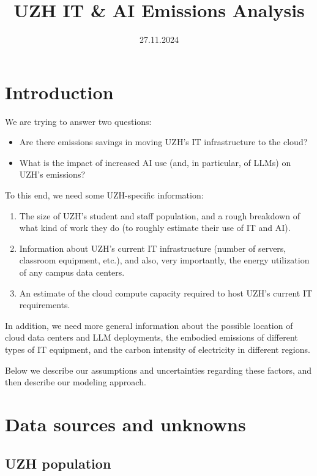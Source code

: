 \documentclass[11pt]{article}
\begin{document}
\title{UZH IT \& AI Emissions Analysis}
\date{27.11.2024}

\section*{Introduction}

We are trying to answer two questions:
\begin{itemize}
    \item Are there emissions savings in moving UZH's IT infrastructure to the cloud?
    \item What is the impact of increased AI use (and, in particular, of LLMs) on UZH's emissions?
\end{itemize}

To this end, we need some UZH-specific information:
\begin{enumerate}
    \item The size of UZH's student and staff population, and a rough breakdown of
        what kind of work they do (to roughly estimate their use of IT and AI).
    \item Information about UZH's current IT infrastructure (number of servers,
        classroom equipment, etc.), and also, very importantly, the energy utilization of any
        campus data centers.
    \item An estimate of the cloud compute capacity required to host UZH's current IT requirements.
\end{enumerate}

In addition, we need more general information about the possible location of cloud data centers and
LLM deployments, the embodied emissions of different types of IT equipment, and the carbon intensity
of electricity in different regions.

Below we describe our assumptions and uncertainties regarding these factors, and then describe
our modeling approach.

\section*{Data sources and unknowns}

\cite{budennyy2022eco2ai}
\cite{castano2023exploring}
\cite{devries2023growing}
\cite{gowda2024watt}
\cite{heguerte2023estimate}
\cite{luccioni2023counting}
\cite{patterson2021carbon}
\cite{rodriguez2024evaluating}
\cite{tomlinson2024carbon}
\cite{tripp2024measuring}

\subsection*{UZH population}
\end{document}
